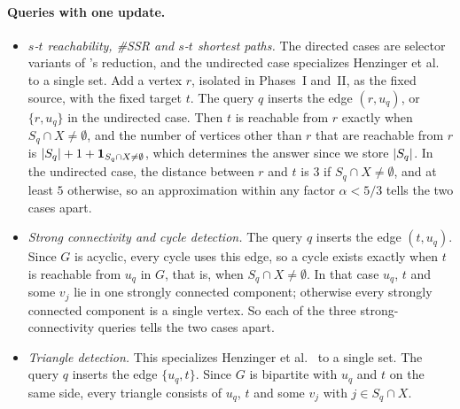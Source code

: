 \paragraph{Queries with one update.}
\begin{itemize}[leftmargin=*]
  \item \emph{$s$-$t$ reachability, \#SSR and $s$-$t$ shortest paths.} The directed cases are selector variants of \Patrascu's reduction, and the undirected case specializes Henzinger et al.~\cite[Lemma~3.2]{henzinger_unifying_2015} to a single set. Add a vertex $r$, isolated in Phases~I and~II, as the fixed source, with the fixed target $t$. The query $q$ inserts the edge $(r,u_q)$, or $\{r,u_q\}$ in the undirected case. Then $t$ is reachable from $r$ exactly when $S_q\cap X\ne\emptyset$, and the number of vertices other than $r$ that are reachable from $r$ is $\left|S_q\right|+1+\mathbf 1_{S_q\cap X\ne\emptyset}$, which determines the answer since we store $\left|S_q\right|$. In the undirected case, the distance between $r$ and $t$ is $3$ if $S_q\cap X\ne\emptyset$, and at least $5$ otherwise, so an approximation within any factor $\alpha<5/3$ tells the two cases apart.
  \item \emph{Strong connectivity and cycle detection.} The query $q$ inserts the edge $(t,u_q)$. Since $G$ is acyclic, every cycle uses this edge, so a cycle exists exactly when $t$ is reachable from $u_q$ in $G$, that is, when $S_q\cap X\ne\emptyset$. In that case $u_q$, $t$ and some $v_j$ lie in one strongly connected component; otherwise every strongly connected component is a single vertex. So each of the three strong-connectivity queries tells the two cases apart.
  \item \emph{Triangle detection.} This specializes Henzinger et al.~\cite[Lemma~3.3]{henzinger_unifying_2015} to a single set. The query $q$ inserts the edge $\{u_q,t\}$. Since $G$ is bipartite with $u_q$ and $t$ on the same side, every triangle consists of $u_q$, $t$ and some $v_j$ with $j\in S_q\cap X$.
\end{itemize}

